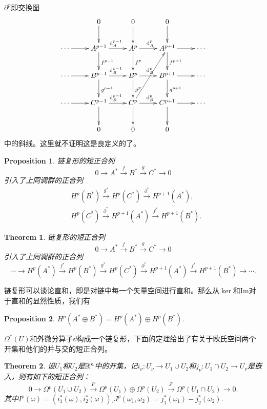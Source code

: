 \documentclass[8pt]{book}
\theoremstyle{plain}%
\newtheorem{pro}{Proposition}[section]%
\newtheorem{theo}{Theorem}[section]%
\begin{document}
$\partial^p$即交换图
	\[
		\xymatrix{
		&0\ar[d]&0\ar[d]&0\ar[d]&\\
\cdots\ar[r]&A^{p-1}\ar[r]^{\dd_A^{p-1}}\ar[d]^{f^{p-1}}&A^p\ar[r]^{\dd_A^p}\ar[d]^{f^{p}}&A^{p+1}\ar[r]\ar[d]^{f^{p+1}}&\cdots\\
\cdots\ar[r]&B^{p-1}\ar[r]^{\dd_B^{p-1}}\ar[d]^{g^{p-1}}&B^p\ar[r]^{\dd_B^p}\ar[d]^{g^{p}}&B^{p+1}\ar[r]\ar[d]^{g^{p+1}}&\cdots\\
\cdots\ar[r]&C^{p-1}\ar[r]^{\dd_B^{p-1}}\ar[d]&C^p\ar[r]^{\dd_B^p}\ar[d]\ar[ruu]&C^{p+1}\ar[r]\ar[d]&\cdots\\
&0&0&0&
		}
	\]
中的斜线。这里就不证明这是良定义的了。

\begin{pro}
链复形的短正合列
\[
0\to A^*\xrightarrow{f}B^*\xrightarrow{g}C^*\to 0
\]
引入了上同调群的正合列
\[
\begin{split}
&H^p(B^*)\xrightarrow{g^*}H^p(C^*)\xrightarrow{\partial^*}H^{p+1}(A^*),\\
&H^p(C^*)\xrightarrow{\partial^*}H^{p+1}(A^*)\xrightarrow{f^*}H^{p+1}(B^*).
\end{split}
\]
\end{pro}
\begin{theo}
\label{changzhenghelie}
链复形的短正合列
\[
0\to A^*\xrightarrow{f}B^*\xrightarrow{g}C^*\to 0
\]
引入了上同调群的正合列
\[
\cdots\to H^p(A^*)\xrightarrow{f^*}H^p(B^*)\xrightarrow{g^*}H^p(C^*)\xrightarrow{\partial^*}H^{p+1}(A^*)\xrightarrow{f^*}H^{p+1}(B^*)\to\cdots.
\]
\end{theo}
链复形可以谈论直和，即是对链中每一个矢量空间进行直和。那么从$\ker$和$\mathrm{Im}$对于直和的显然性质，我们有
\begin{pro}
\label{zhihe}
$H^p(A^*\oplus B^*)=H^p(A^*)\oplus H^p(B^*)$.
\end{pro}
$\Omega^*(U)$和外微分算子$\dd$构成一个链复形，下面的定理给出了有关于欧氏空间两个开集和他们的并与交的短正合列。
\begin{theo}
设$U_1$和$U_2$是$\mathbb{R}^n$中的开集，记$i_\nu:U_\nu \to U_1 \cup U_2$和$j_\nu:U_1\cap U_2 \to U_\nu$是嵌入，则有如下的短正合列：
\[
0\to \Omega^p(U_1\cup U_2)\xrightarrow{I^p}\Omega^p(U_1)\oplus\Omega^p(U_2)\xrightarrow{J^p}\Omega^p(U_1\cap U_2)\to 0.
\]
其中$I^p(\omega)=(i_1^*(\omega),i_2^*(\omega))$,$J^p(\omega_1,\omega_2)=j_1^*(\omega_1)-j_2^*(\omega_2)$.
\end{theo}
\end{document}
